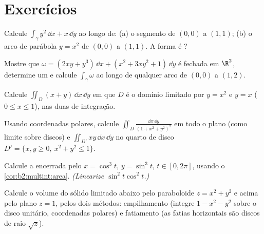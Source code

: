 \section{Exercícios}

\begin{exercise}[$\star$]\label{exo:b2:multint:1}
Calcule $\int_\gamma y^2\,\dd x + x\,\dd y$ ao longo de: (a) o segmento
de $(0,0)$ a $(1,1)$; (b) o arco de parábola $y = x^2$ de
$(0,0)$ a $(1,1)$. A forma é ?
\end{exercise}

\begin{exercise}[$\star$]\label{exo:b2:multint:2}
Mostre que $\omega = (2xy + y^3)\,\dd x + (x^2 + 3xy^2 + 1)\,\dd y$
é fechada em $\R^2$, determine um  e calcule
$\int_\gamma\omega$ ao longo de qualquer arco de $(0, 0)$ a $(1, 2)$.
\end{exercise}

\begin{exercise}[$\star$]\label{exo:b2:multint:3}
Calcule $\iint_D (x + y)\,\dd x\,\dd y$ em que $D$ é o domínio
limitado por $y = x^2$ e $y = x$ ($0 \leq x \leq 1$), nas duas
 de integração.
\end{exercise}

\begin{exercise}[$\star\star$]\label{exo:b2:multint:4}
Usando coordenadas polares, calcule $\iint_D \frac{\dd x\,\dd y}{(1 +
x^2 + y^2)^2}$ em todo o plano (como limite sobre discos) e
$\iint_{D'} xy\,\dd x\,\dd y$ no quarto de disco $D' = \{x, y
\geq 0,\ x^2 + y^2 \leq 1\}$.
\end{exercise}

\begin{exercise}[$\star\star$]\label{exo:b2:multint:5}
Calcule a  encerrada pelo  $x = \cos^3 t$, $y =
\sin^3 t$, $t \in [0, 2\pi]$, usando o
\cref{cor:b2:multint:area}. \emph{(Linearize $\sin^2 t\cos^2 t$.)}
\end{exercise}

\begin{exercise}[$\star\star$]\label{exo:b2:multint:6}
Calcule o volume do sólido limitado abaixo pelo paraboloide $z
= x^2 + y^2$ e acima pelo plano $z = 1$, pelos dois métodos:
empilhamento (integre $1 - x^2 - y^2$ sobre o disco unitário, coordenadas
polares) e fatiamento (as fatias horizontais são discos de raio
$\sqrt z$).
\end{exercise}

